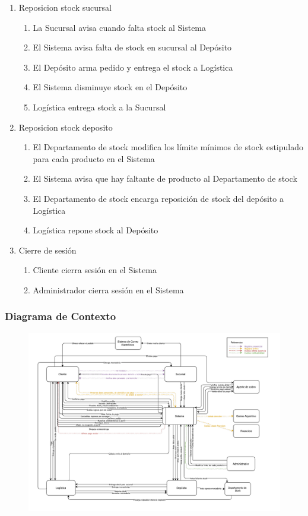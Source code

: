 \begin{enumerate}
 \item Reposicion stock sucursal
  \begin{enumerate}
    \item La Sucursal avisa cuando falta stock al Sistema
    \item El Sistema avisa falta de stock en sucursal al Depósito
    \item El Depósito arma pedido y entrega el stock a Logística
    \item El Sistema disminuye stock en el Depósito
    \item Logística entrega stock a la Sucursal
  \end{enumerate}

 \item Reposicion stock deposito
  \begin{enumerate}
    \item El Departamento de stock modifica los límite m\'inimos de stock estipulado para cada producto en el Sistema
    \item El Sistema avisa que hay faltante de producto al Departamento de stock
    \item El Departamento de stock encarga reposición de stock del depósito a Logística
    \item Logística repone stock al Depósito
  \end{enumerate}

 \item Cierre de sesi\'on
  \begin{enumerate}
    \item Cliente cierra sesión en el Sistema 
    \item Administrador	cierra sesión en el Sistema 
  \end{enumerate}
\end{enumerate}
\clearpage

\subsubsection{Diagrama de Contexto}

\begin{figure}[H]
  \begin{center}
  \includegraphics[height=0.65\textheight,angle=90]{images/contexto.pdf}
  \end{center}
\end{figure}
